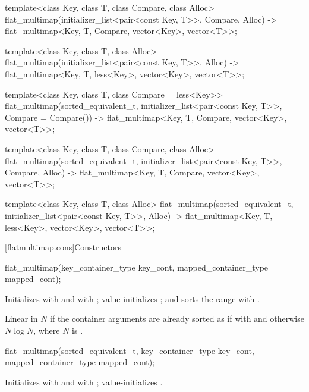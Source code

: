 \begin{codeblock}
\begin{codeblock}
\begin{codeblock}
\begin{addedblock}
\begin{codeblock}
{  template<class Key, class T, class Compare, class Alloc>
    flat_multimap(initializer_list<pair<const Key, T>>, Compare, Alloc)
      -> flat_multimap<Key, T, Compare, vector<Key>, vector<T>>;

  template<class Key, class T, class Alloc>
    flat_multimap(initializer_list<pair<const Key, T>>, Alloc)
      -> flat_multimap<Key, T, less<Key>, vector<Key>, vector<T>>;

  template<class Key, class T, class Compare = less<Key>>
  flat_multimap(sorted_equivalent_t, initializer_list<pair<const Key, T>>,
                Compare = Compare())
      -> flat_multimap<Key, T, Compare, vector<Key>, vector<T>>;

  template<class Key, class T, class Compare, class Alloc>
    flat_multimap(sorted_equivalent_t, initializer_list<pair<const Key, T>>, Compare, Alloc)
      -> flat_multimap<Key, T, Compare, vector<Key>, vector<T>>;

  template<class Key, class T, class Alloc>
    flat_multimap(sorted_equivalent_t, initializer_list<pair<const Key, T>>, Alloc)
      -> flat_multimap<Key, T, less<Key>, vector<Key>, vector<T>>;
}
\end{codeblock}

[flatmultimap.cons]{Constructors}

%
\begin{itemdecl}
flat_multimap(key_container_type key_cont, mapped_container_type mapped_cont);
\end{itemdecl}

\begin{itemdescr}
\pnum
\effects Initializes  with
 and  with
; value-initializes ; and sorts the range
 with .

\pnum
\complexity
Linear in $N$ if the container arguments are already sorted as if
with  and otherwise $N \log N$, where $N$
is .
\end{itemdescr}

%
\begin{itemdecl}
flat_multimap(sorted_equivalent_t, key_container_type key_cont, mapped_container_type mapped_cont);
\end{itemdecl}

\begin{itemdescr}
\pnum
\effects Initializes  with
 and  with
; value-initializes .


\end{itemdescr}
\end{addedblock}
\end{codeblock}
\end{codeblock}
\end{codeblock}
